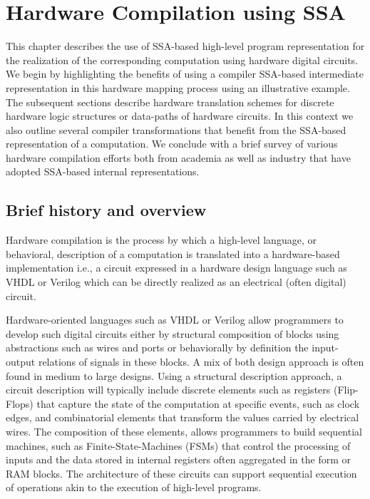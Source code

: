 \chapter{Hardware Compilation using SSA
}
\label{chapter:hardware_compilation}

This chapter describes the use of SSA-based high-level program representation for the realization of the corresponding computation using hardware digital circuits. 
  We begin by highlighting the benefits of using a compiler SSA-based intermediate representation in this hardware mapping process using an illustrative example. 
  The subsequent sections describe hardware translation schemes for discrete hardware logic structures or data-paths of hardware circuits. 
  In this context we also outline several compiler transformations that benefit from the SSA-based representation of a computation. 
  We conclude with a brief survey of various hardware compilation efforts both from academia as well as industry that have adopted SSA-based internal representations.


\renewcommand{\comment}[1]{}

\section{Brief history and overview}

Hardware compilation is the process by which a high-level language, or behavioral, description of a computation is translated into a hardware-based implementation i.e., a circuit expressed in a hardware design language such as VHDL or Verilog which can be directly realized as an electrical (often digital) circuit. 

Hardware-oriented languages such as VHDL or Verilog allow programmers to develop such digital circuits either by structural composition of blocks using abstractions such as wires and ports or behaviorally  by definition the input-output relations of signals in these blocks. A mix of both design approach is often found in medium to large designs. 
Using a structural description approach, a circuit description  will typically include discrete elements such as registers (Flip-Flops) that capture the state of the computation at specific events, such as clock edges, and combinatorial elements that transform the values carried by electrical wires. The composition of these elements, allows programmers to build sequential machines, such as Finite-State-Machines (FSMs) that control the processing of inputs and the data stored in internal registers often aggregated in the form or RAM blocks. The architecture of these circuits can support sequential execution of operations akin to the execution of high-level programs.

